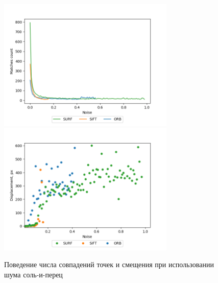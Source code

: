 {{   			\begin{figure}[H]
   				\centering                             
   				\includegraphics[width=0.75\textwidth,keepaspectratio]{ex2/sp/Rand_noises_matches.png}   
   				\includegraphics[width=0.75\textwidth,keepaspectratio]{ex2/sp/Rand_noises_displacement.png}       
   				\centering\caption{ Поведение числа совпадений точек и смещения при использовании шума соль-и-перец}
   				\label{rand_noises_sp}                           
   			\end{figure}   
   			
}
}

\newpage
